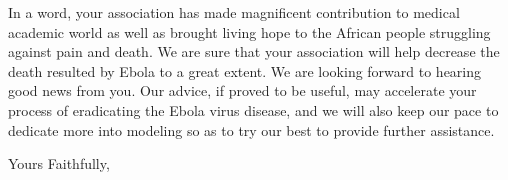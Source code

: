 \documentclass{letter}
\begin{document}
\begin{letter}{}
    In a word, your association has made magnificent contribution to medical academic world as well as brought living hope to the African people struggling against pain and death. We are sure that your association will help decrease the death resulted by Ebola to a great extent. We are looking forward to hearing good news from you. Our advice, if proved to be useful, may accelerate your process of eradicating the Ebola virus disease, and we will also keep our pace to dedicate more into modeling so as to try our best to provide further assistance. 



\closing{Yours Faithfully,}


\end{letter}
\end{document}
